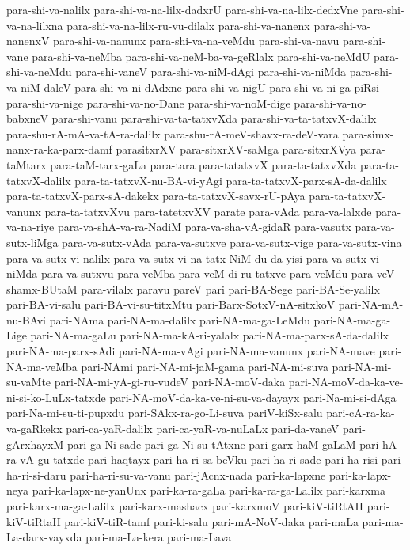 {para-shi-va-nalilx
para-shi-va-na-lilx-dadxrU
para-shi-va-na-lilx-dedxVne
para-shi-va-na-lilxna
para-shi-va-na-lilx-ru-vu-dilalx
para-shi-va-nanenx
para-shi-va-nanenxV
para-shi-va-nanunx
para-shi-va-na-veMdu
para-shi-va-navu
para-shi-vane
para-shi-va-neMba
para-shi-va-neM-ba-va-geRlalx
para-shi-va-neMdU
para-shi-va-neMdu
para-shi-vaneV
para-shi-va-niM-dAgi
para-shi-va-niMda
para-shi-va-niM-daleV
para-shi-va-ni-dAdxne
para-shi-va-nigU
para-shi-va-ni-ga-piRsi
para-shi-va-nige
para-shi-va-no-Dane
para-shi-va-noM-dige
para-shi-va-no-babxneV
para-shi-vanu
para-shi-va-ta-tatxvXda
para-shi-va-ta-tatxvX-dalilx
para-shu-rA-mA-va-tA-ra-dalilx
para-shu-rA-meV-shavx-ra-deV-vara
para-simx-nanx-ra-ka-parx-damf
parasitxrXV
para-sitxrXV-saMga
para-sitxrXVya
para-taMtarx
para-taM-tarx-gaLa
para-tara
para-tatatxvX
para-ta-tatxvXda
para-ta-tatxvX-dalilx
para-ta-tatxvX-nu-BA-vi-yAgi
para-ta-tatxvX-parx-sA-da-dalilx
para-ta-tatxvX-parx-sA-dakekx
para-ta-tatxvX-savx-rU-pAya
para-ta-tatxvX-vanunx
para-ta-tatxvXvu
para-tatetxvXV
parate
para-vAda
para-va-lalxde
para-va-na-riye
para-va-shA-va-ra-NadiM
para-va-sha-vA-gidaR
para-vasutx
para-va-sutx-liMga
para-va-sutx-vAda
para-va-sutxve
para-va-sutx-vige
para-va-sutx-vina
para-va-sutx-vi-nalilx
para-va-sutx-vi-na-tatx-NiM-du-da-yisi
para-va-sutx-vi-niMda
para-va-sutxvu
para-veMba
para-veM-di-ru-tatxve
para-veMdu
para-veV-shamx-BUtaM
para-vilalx
paravu
pareV
pari
pari-BA-Sege
pari-BA-Se-yalilx
pari-BA-vi-salu
pari-BA-vi-su-titxMtu
pari-Barx-SotxV-nA-sitxkoV
pari-NA-mA-nu-BAvi
pari-NAma
pari-NA-ma-dalilx
pari-NA-ma-ga-LeMdu
pari-NA-ma-ga-Lige
pari-NA-ma-gaLu
pari-NA-ma-kA-ri-yalalx
pari-NA-ma-parx-sA-da-dalilx
pari-NA-ma-parx-sAdi
pari-NA-ma-vAgi
pari-NA-ma-vanunx
pari-NA-mave
pari-NA-ma-veMba
pari-NAmi
pari-NA-mi-jaM-gama
pari-NA-mi-suva
pari-NA-mi-su-vaMte
pari-NA-mi-yA-gi-ru-vudeV
pari-NA-moV-daka
pari-NA-moV-da-ka-ve-ni-si-ko-LuLx-tatxde
pari-NA-moV-da-ka-ve-ni-su-va-dayayx
pari-Na-mi-si-dAga
pari-Na-mi-su-ti-pupxdu
pari-SAkx-ra-go-Li-suva
pariV-kiSx-salu
pari-cA-ra-ka-va-gaRkekx
pari-ca-yaR-dalilx
pari-ca-yaR-va-nuLaLx
pari-da-vaneV
pari-gArxhayxM
pari-ga-Ni-sade
pari-ga-Ni-su-tAtxne
pari-garx-haM-gaLaM
pari-hA-ra-vA-gu-tatxde
pari-haqtayx
pari-ha-ri-sa-beVku
pari-ha-ri-sade
pari-ha-risi
pari-ha-ri-si-daru
pari-ha-ri-su-va-vanu
pari-jAcnx-nada
pari-ka-lapxne
pari-ka-lapx-neya
pari-ka-lapx-ne-yanUnx
pari-ka-ra-gaLa
pari-ka-ra-ga-Lalilx
pari-karxma
pari-karx-ma-ga-Lalilx
pari-karx-mashacx
pari-karxmoV
pari-kiV-tiRtAH
pari-kiV-tiRtaH
pari-kiV-tiR-tamf
pari-ki-salu
pari-mA-NoV-daka
pari-maLa
pari-ma-La-darx-vayxda
pari-ma-La-kera
pari-ma-Lava
}
